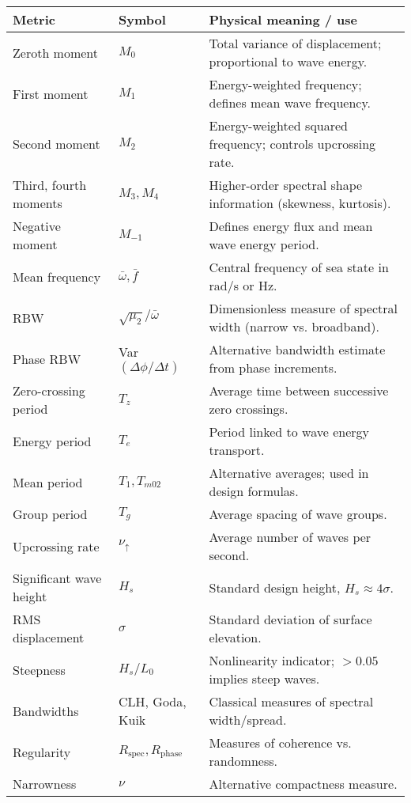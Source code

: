 \documentclass[11pt]{article}
\begin{document}
\begin{table}[h!]
\centering
\renewcommand{\arraystretch}{1.2}
\begin{tabular}{|l|l|p{8cm}|}
\hline
\textbf{Metric} & \textbf{Symbol} & \textbf{Physical meaning / use} \\
\hline
Zeroth moment & $M_0$ & Total variance of displacement; proportional to wave energy. \\
First moment & $M_1$ & Energy-weighted frequency; defines mean wave frequency. \\
Second moment & $M_2$ & Energy-weighted squared frequency; controls upcrossing rate. \\
Third, fourth moments & $M_3, M_4$ & Higher-order spectral shape information (skewness, kurtosis). \\
Negative moment & $M_{-1}$ & Defines energy flux and mean wave energy period. \\
\hline
Mean frequency & $\bar{\omega}, \bar{f}$ & Central frequency of sea state in rad/s or Hz. \\
RBW & $\sqrt{\mu_2}/\bar{\omega}$ & Dimensionless measure of spectral width (narrow vs. broadband). \\
Phase RBW & Var$(\Delta \phi / \Delta t)$ & Alternative bandwidth estimate from phase increments. \\
\hline
Zero-crossing period & $T_z$ & Average time between successive zero crossings. \\
Energy period & $T_e$ & Period linked to wave energy transport. \\
Mean period & $T_1, T_{m02}$ & Alternative averages; used in design formulas. \\
Group period & $T_g$ & Average spacing of wave groups. \\
Upcrossing rate & $\nu_\uparrow$ & Average number of waves per second. \\
\hline
Significant wave height & $H_s$ & Standard design height, $H_s \approx 4\sigma$. \\
RMS displacement & $\sigma$ & Standard deviation of surface elevation. \\
Steepness & $H_s/L_0$ & Nonlinearity indicator; $>0.05$ implies steep waves. \\
\hline
Bandwidths & CLH, Goda, Kuik & Classical measures of spectral width/spread. \\
Regularity & $R_{\text{spec}}, R_{\text{phase}}$ & Measures of coherence vs. randomness. \\
Narrowness & $\nu$ & Alternative compactness measure. \\

\end{tabular}
\end{table}
\end{document}
